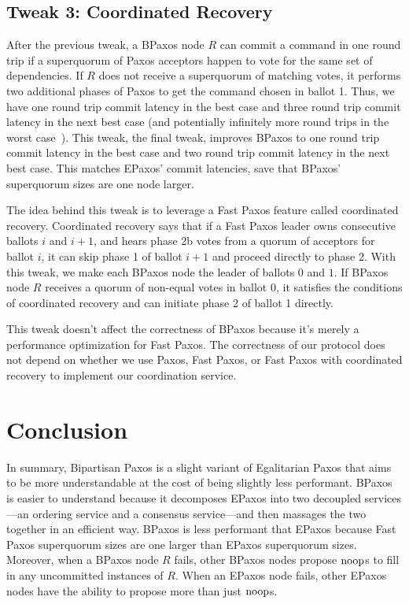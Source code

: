 \documentclass{mwhittaker}
\begin{document}
\subsection{Tweak 3: Coordinated Recovery}
After the previous tweak, a BPaxos node $R$ can commit a command in one round
trip if a superquorum of Paxos acceptors happen to vote for the same set of
dependencies. If $R$ does not receive a superquorum of matching votes, it
performs two additional phases of Paxos to get the command chosen in ballot 1.
Thus, we have one round trip commit latency in the best case and three round
trip commit latency in the next best case (and potentially infinitely more
round trips in the worst case~\cite{fischer1982impossibility}). This tweak, the
final tweak, improves BPaxos to one round trip commit latency in the best case
and two round trip commit latency in the next best case. This matches EPaxos'
commit latencies, save that BPaxos' superquorum sizes are one node larger.

The idea behind this tweak is to leverage a Fast Paxos feature called
coordinated recovery. Coordinated recovery says that if a Fast Paxos leader
owns consecutive ballots $i$ and $i + 1$, and hears phase 2b votes from a
quorum of acceptors for ballot $i$, it can skip phase 1 of ballot $i + 1$ and
proceed directly to phase 2. With this tweak, we make each BPaxos node the
leader of ballots $0$ and $1$. If BPaxos node $R$ receives a quorum of
non-equal votes in ballot $0$, it satisfies the conditions of coordinated
recovery and can initiate phase 2 of ballot 1 directly.

This tweak doesn't affect the correctness of BPaxos because it's merely a
performance optimization for Fast Paxos. The correctness of our protocol does
not depend on whether we use Paxos, Fast Paxos, or Fast Paxos with coordinated
recovery to implement our coordination service.

\section{Conclusion}
In summary, Bipartisan Paxos is a slight variant of Egalitarian Paxos that aims
to be more understandable at the cost of being slightly less performant. BPaxos
is easier to understand because it decomposes EPaxos into two decoupled
services---an ordering service and a consensus service---and then massages the
two together in an efficient way. BPaxos is less performant that EPaxos because
Fast Paxos superquorum sizes are one larger than EPaxos superquorum sizes.
Moreover, when a BPaxos node $R$ fails, other BPaxos nodes propose $\text{noop}$s to
fill in any uncommitted instances of $R$. When an EPaxos node fails, other
EPaxos nodes have the ability to propose more than just $\text{noop}$s.



\end{document}
